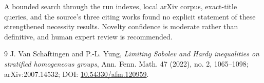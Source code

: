 \documentclass[11pt]{article}
\begin{document}
A bounded search through the run indexes, local arXiv corpus, exact-title
queries, and the source's three citing works found no explicit statement of
these strengthened necessity results.  Novelty confidence is moderate rather
than definitive, and human expert review is recommended.

\begin{thebibliography}{9}
J. Van Schaftingen and P.-L. Yung,
\emph{Limiting Sobolev and Hardy inequalities on stratified homogeneous
groups}, Ann. Fenn. Math. 47 (2022), no. 2, 1065--1098;
arXiv:2007.14532; DOI: \href{https://doi.org/10.54330/afm.120959}{10.54330/afm.120959}.
\end{thebibliography}
\end{document}
